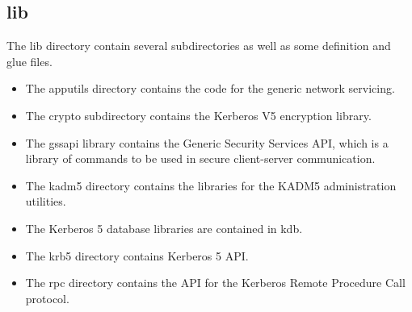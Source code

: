 \documentclass[letterpaper,10pt,english]{sphinxmanual}
\begin{document}
\subsection{lib}
\label{build/directory_org:lib}\label{build/directory_org:id1}
The lib directory contain several subdirectories as well as some
definition and glue files.
\begin{itemize}
\item {} 
The apputils directory contains the code for the generic network
servicing.

\item {} 
The crypto subdirectory contains the Kerberos V5 encryption
library.

\item {} 
The gssapi library contains the Generic Security Services API,
which is a library of commands to be used in secure client-server
communication.

\item {} 
The kadm5 directory contains the libraries for the KADM5
administration utilities.

\item {} 
The Kerberos 5 database libraries are contained in kdb.

\item {} 
The krb5 directory contains Kerberos 5 API.

\item {} 
The rpc directory contains the API for the Kerberos Remote
Procedure Call protocol.

\end{itemize}
\end{document}
